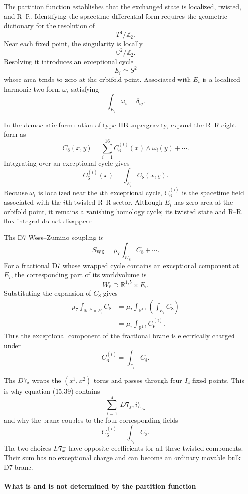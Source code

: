 \documentclass[
  10pt,
  a4paper,
  openany]{book}
\begin{document}
The partition function establishes that the exchanged state is
localized, twisted, and R--R. Identifying the spacetime differential
form requires the geometric dictionary for the resolution of \[
T^4/\mathbb Z_2.
\] Near each fixed point, the singularity is locally \[
\mathbb C^2/\mathbb Z_2.
\] Resolving it introduces an exceptional cycle \[
E_i\simeq S^2
\] whose area tends to zero at the orbifold point. Associated with
\(E_i\) is a localized harmonic two-form \(\omega_i\) satisfying \[
\int_{E_j}\omega_i
=
\delta_{ij}.
\]

In the democratic formulation of type-IIB supergravity, expand the R--R
eight-form as \[
C_8(x,y)
=
\sum_{i=1}^{16}
C_6^{(i)}(x)\wedge\omega_i(y)
+
\cdots.
\] Integrating over an exceptional cycle gives \[
\boxed{
C_6^{(i)}(x)
=
\int_{E_i}C_8(x,y).
}
\] Because \(\omega_i\) is localized near the \(i\)th exceptional cycle,
\(C_6^{(i)}\) is the spacetime field associated with the \(i\)th twisted
R--R sector. Although \(E_i\) has zero area at the orbifold point, it
remains a vanishing homology cycle; its twisted state and R--R flux
integral do not disappear.

The D7 Wess--Zumino coupling is \[
S_{\mathrm{WZ}}
=
\mu_7\int_{W_8}C_8
+
\cdots.
\] For a fractional D7 whose wrapped cycle contains an exceptional
component at \(E_i\), the corresponding part of its worldvolume is \[
W_8
\supset
\mathbb R^{1,5}\times E_i.
\] Substituting the expansion of \(C_8\) gives \[
\begin{aligned}
\mu_7\int_{\mathbb R^{1,5}\times E_i}C_8
&=
\mu_7\int_{\mathbb R^{1,5}}
\left(
\int_{E_i}C_8
\right)\\
&=
\mu_7\int_{\mathbb R^{1,5}}C_6^{(i)}.
\end{aligned}
\] Thus the exceptional component of the fractional brane is
electrically charged under \[
\boxed{
C_6^{(i)}
=
\int_{E_i}C_8.
}
\]

The \(D7_x\) wraps the \((x^1,x^2)\) torus and passes through four
\(I_4\) fixed points. This is why equation (15.39) contains \[
\sum_{i=1}^{4}|D7_x,i\rangle_{\mathrm{tw}}
\] and why the brane couples to the four corresponding fields \[
C_6^{(i)}
=
\int_{E_i}C_8.
\] The two choices \(D7_x^\pm\) have opposite coefficients for all these
twisted components. Their sum has no exceptional charge and can become
an ordinary movable bulk D7-brane.

\paragraph{What is and is not determined by the partition
function}\label{what-is-and-is-not-determined-by-the-partition-function}
\end{document}
